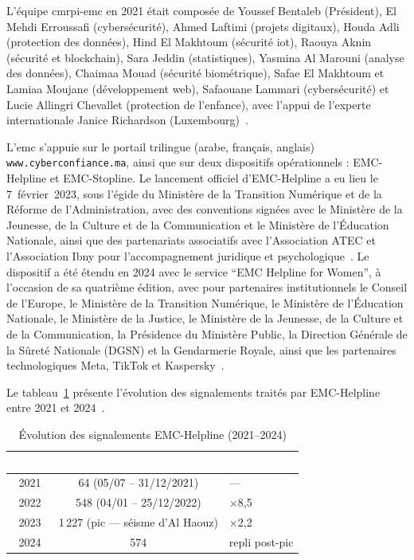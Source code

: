 L'équipe \gls{cmrpi}-\gls{emc} en 2021 était composée de Youssef Bentaleb (Président), El Mehdi Erroussafi (cybersécurité), Ahmed Laftimi (projets digitaux), Houda Adli (protection des données), Hind El Makhtoum (sécurité \gls{iot}), Raouya Aknin (sécurité et blockchain), Sara Jeddin (statistiques), Yasmina Al Marouni (analyse des données), Chaimaa Mouad (sécurité biométrique), Safae El Makhtoum et Lamiaa Moujane (développement web), Safaouane Lammari (cybersécurité) et Lucie Allingri Chevallet (protection de l'enfance), avec l'appui de l'experte internationale Janice Richardson (Luxembourg)~\cite{emcrapport2021}.

L'\gls{emc} s'appuie sur le portail trilingue (arabe, français, anglais) \texttt{www.\allowbreak cyberconfiance.\allowbreak ma}, ainsi que sur deux dispositifs opérationnels : EMC-Helpline et EMC-Stopline. Le lancement officiel d'EMC-Helpline a eu lieu le 7~février~2023, sous l'égide du Ministère de la Transition Numérique et de la Réforme de l'Administration, avec des conventions signées avec le Ministère de la Jeunesse, de la Culture et de la Communication et le Ministère de l'Éducation Nationale, ainsi que des partenariats associatifs avec l'Association ATEC et l'Association Ibny pour l'accompagnement juridique et psychologique~\cite{emcrapport2023}. Le dispositif a été étendu en 2024 avec le service \enquote{EMC Helpline for Women}, à l'occasion de sa quatrième édition, avec pour partenaires institutionnels le Conseil de l'Europe, le Ministère de la Transition Numérique, le Ministère de l'Éducation Nationale, le Ministère de la Justice, le Ministère de la Jeunesse, de la Culture et de la Communication, la Présidence du Ministère Public, la Direction Générale de la Sûreté Nationale (DGSN) et la Gendarmerie Royale, ainsi que les partenaires technologiques Meta, TikTok et Kaspersky~\cite{emcrapport2024}.

Le tableau~\ref{tab:emc_stats} présente l'évolution des signalements traités par EMC-Helpline entre 2021 et 2024~\cite{emcstats2024}.

\begin{table}[H]
  \centering
  \caption{Évolution des signalements EMC-Helpline (2021--2024)}
  \label{tab:emc_stats}
  \renewcommand{\arraystretch}{1.3}
  \begin{tabular}{|c|c|l|}
    \hline
    \rowcolor{iacsTableHead}
    \textcolor{white}{\textbf{Année}} &
    \textcolor{white}{\textbf{Signalements}} &
    \textcolor{white}{\textbf{Évolution}} \\
    \hline
    2021 & 64 (05/07 -- 31/12/2021) & --- \\
    \hline
    \rowcolor{iacsLightGray}
    2022 & 548 (04/01 -- 25/12/2022) & $\times$8,5 \\
    \hline
    2023 & 1\,227 (pic --- séisme d'Al Haouz) & $\times$2,2 \\
    \hline
    \rowcolor{iacsLightGray}
    2024 & 574 & repli post-pic \\
    \hline
  \end{tabular}
\end{table}

